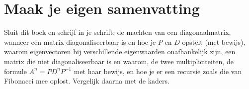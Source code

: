 
\begin{oefeningen}






\end{oefeningen}


\ifzelfstudie
\section*{Maak je eigen samenvatting}
Sluit dit boek en schrijf in je schrift: de machten van een diagonaalmatrix, wanneer een matrix diagonaliseerbaar is en hoe je $P$ en $D$ opstelt (met bewijs), waarom eigenvectoren bij verschillende eigenwaarden onafhankelijk zijn, een matrix die niet diagonaliseerbaar is en waarom, de twee multipliciteiten, de formule $A^n = PD^nP^{-1}$ met haar bewijs, en hoe je er een recursie zoals die van Fibonacci mee oplost. Vergelijk daarna met de kaders.
\fi
